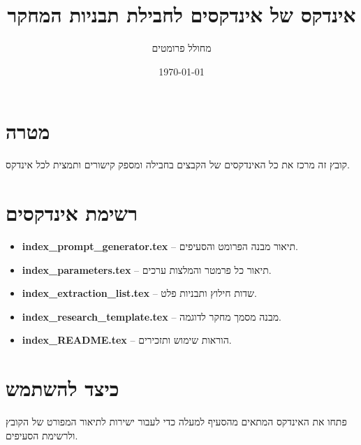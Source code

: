 \documentclass[12pt]{article}
\begin{document}
\title{אינדקס של אינדקסים לחבילת תבניות המחקר}
\author{מחולל פרומטים}
\date{\today}
\maketitle

\section*{מטרה}
קובץ זה מרכז את כל האינדקסים של הקבצים בחבילה ומספק קישורים ותמצית לכל אינדקס.

\section*{רשימת אינדקסים}
\begin{itemize}
  \item \textbf{index\_prompt\_generator.tex} -- תיאור מבנה הפרומט והסעיפים.
  \item \textbf{index\_parameters.tex} -- תיאור כל פרמטר והמלצות ערכים.
  \item \textbf{index\_extraction\_list.tex} -- שדות חילוץ ותבניות פלט.
  \item \textbf{index\_research\_template.tex} -- מבנה מסמך מחקר לדוגמה.
  \item \textbf{index\_README.tex} -- הוראות שימוש ותזכירים.
\end{itemize}

\section*{כיצד להשתמש}
פתחו את האינדקס המתאים מהסעיף למעלה כדי לעבור ישירות לתיאור המפורט של הקובץ ולרשימת הסעיפים.
\end{document}
